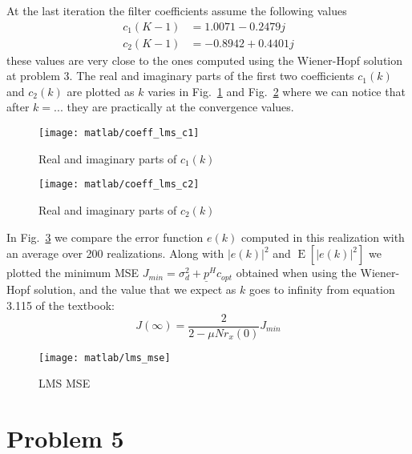 \documentclass{article}
\renewcommand{\vec}[1]{
  \underline{#1}
}
\newcommand{\E}[1]{
  \operatorname{E}\left[ #1 \right]
}
\newcommand{\abs}[1]{
  \left| #1 \right|
}
\begin{document}
At the last iteration the filter coefficients assume the following
values
\begin{align*}
  c_1(K-1) &= 1.0071  - 0.2479j \\
  c_2(K-1) &= -0.8942 + 0.4401j
\end{align*}
these values are very close to the ones computed using the Wiener-Hopf
solution at problem 3. The real and imaginary parts of the first two
coefficients $c_1(k)$ and $c_2(k)$ are plotted as $k$ varies in
Fig.~\ref{plot:coeff_lms_c1} and Fig.~\ref{plot:coeff_lms_c2} where we
can notice that after $k= ...$ they are practically at the convergence
values.
\begin{figure}[htbp]
  \centering
  \texttt{[image: matlab/coeff\_lms\_c1]}
  \caption{Real and imaginary parts of $c_1(k)$}
  \label{plot:coeff_lms_c1}
\end{figure}
\begin{figure}[htbp]
  \centering
  \texttt{[image: matlab/coeff\_lms\_c2]}
  \caption{Real and imaginary parts of $c_2(k)$}
  \label{plot:coeff_lms_c2}
\end{figure}
In Fig.~\ref{plot:lms_mse} we compare the error function $e(k)$
computed in this realization with an average over 200 realizations.
Along with $\abs{e(k)}^2$ and $\E{ \abs{e(k)}^2 }$ we plotted the minimum MSE
$J_{min} = \sigma^2_d + \vec{p}^Hc_{opt}$ obtained when using the
Wiener-Hopf solution, and the value that we expect as $k$ goes to
infinity from equation 3.115 of the textbook:
\[ J(\infty) = \frac{2}{2-\mu N r_x(0)}J_{min} \]
\begin{figure}[htbp]
  \centering
  \texttt{[image: matlab/lms\_mse]}
  \caption{LMS MSE}
  \label{plot:lms_mse}
\end{figure}
\section*{Problem 5}
\end{document}
